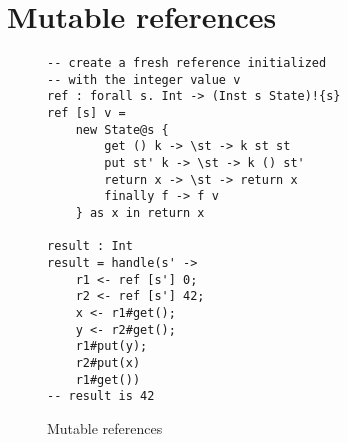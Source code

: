 \section{Mutable references}
\begin{figure}[h]
\caption{Mutable references}
\begin{verbatim}
-- create a fresh reference initialized
-- with the integer value v
ref : forall s. Int -> (Inst s State)!{s}
ref [s] v =
	new State@s {
		get () k -> \st -> k st st
		put st' k -> \st -> k () st'
		return x -> \st -> return x
		finally f -> f v
	} as x in return x

result : Int
result = handle(s' ->
	r1 <- ref [s'] 0;
	r2 <- ref [s'] 42;
	x <- r1#get();
	y <- r2#get();
	r1#put(y);
	r2#put(x)
	r1#get())
-- result is 42
\end{verbatim}
\label{fig:references}
\end{figure}

